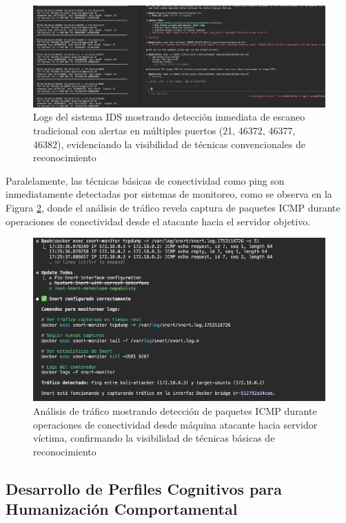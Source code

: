 \begin{figure}[!htbp]
\centering
\includegraphics[width=1\textwidth]{figures/deteccionensshydemasprotocolos scriptbase.png}
\caption{Logs del sistema IDS mostrando detección inmediata de escaneo tradicional con alertas en múltiples puertos (21, 46372, 46377, 46382), evidenciando la visibilidad de técnicas convencionales de reconocimiento}
\label{fig:nmap_detection}
\end{figure}

Paralelamente, las técnicas básicas de conectividad como ping son inmediatamente detectadas por sistemas de monitoreo, como se observa en la Figura \ref{fig:ping_detection_tcpdump}, donde el análisis de tráfico revela captura de paquetes ICMP durante operaciones de conectividad desde el atacante hacia el servidor objetivo.

\begin{figure}[!htbp]
\centering
\includegraphics[width=1\textwidth]{figures/detectaping.png}
\caption{Análisis de tráfico mostrando detección de paquetes ICMP durante operaciones de conectividad desde máquina atacante hacia servidor víctima, confirmando la visibilidad de técnicas básicas de reconocimiento}
\label{fig:ping_detection_tcpdump}
\end{figure}

\subsection{Desarrollo de Perfiles Cognitivos para Humanización Comportamental}
\FloatBarrier

